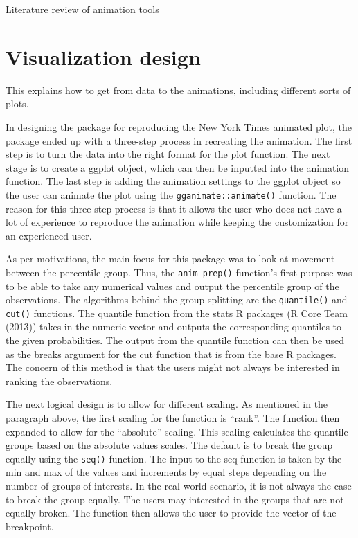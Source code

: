Literature review of animation tools

\hypertarget{visualization-design}{%
\section{Visualization design}\label{visualization-design}}

This explains how to get from data to the animations, including different sorts of plots.

In designing the package for reproducing the New York Times animated plot, the package ended up with a three-step process in recreating the animation. The first step is to turn the data into the right format for the plot function. The next stage is to create a ggplot object, which can then be inputted into the animation function. The last step is adding the animation settings to the ggplot object so the user can animate the plot using the \texttt{gganimate::animate()} function. The reason for this three-step process is that it allows the user who does not have a lot of experience to reproduce the animation while keeping the customization for an experienced user.

As per motivations, the main focus for this package was to look at movement between the percentile group. Thus, the \texttt{anim\_prep()} function's first purpose was to be able to take any numerical values and output the percentile group of the observations. The algorithms behind the group splitting are the \texttt{quantile()} and \texttt{cut()} functions. The quantile function from the stats R packages (R Core Team (2013)) takes in the numeric vector and outputs the corresponding quantiles to the given probabilities. The output from the quantile function can then be used as the breaks argument for the cut function that is from the base R packages. The concern of this method is that the users might not always be interested in ranking the observations.

The next logical design is to allow for different scaling. As mentioned in the paragraph above, the first scaling for the function is ``rank''. The function then expanded to allow for the ``absolute'' scaling. This scaling calculates the quantile groups based on the absolute values scales. The default is to break the group equally using the \texttt{seq()} function. The input to the seq function is taken by the min and max of the values and increments by equal steps depending on the number of groups of interests. In the real-world scenario, it is not always the case to break the group equally. The users may interested in the groups that are not equally broken. The function then allows the user to provide the vector of the breakpoint.

